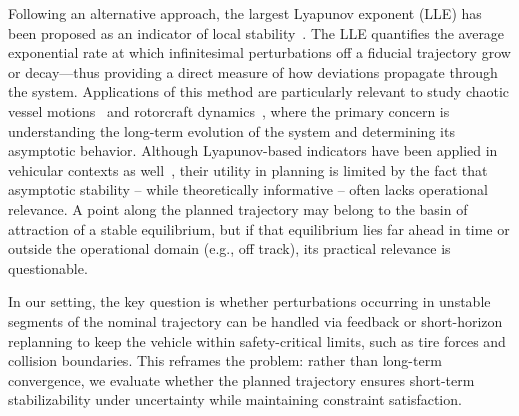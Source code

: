 Following an alternative approach, the largest Lyapunov exponent (LLE) has been proposed as an indicator of local stability~\cite{Meng:AnalysisGlobalCharacteristics:2022}. The LLE quantifies the average exponential rate at which infinitesimal perturbations off a fiducial trajectory grow or decay---thus providing a direct measure of how deviations propagate through the system.
Applications of this method are particularly relevant to study chaotic vessel motions~\cite{McCue:UseLyapunovExponents:2011} and rotorcraft dynamics~\cite{Tamer:StabilityNonlinearTimeDependent:2016,Cassoni:RotorcraftStabilityAnalysis:2024}, where the primary concern is understanding the long-term evolution of the system and determining its asymptotic behavior.
Although Lyapunov-based indicators have been applied in vehicular contexts as well~\cite{Sadri:StabilityAnalysisNonlinear:2013,Meng:AnalysisGlobalCharacteristics:2022}, their utility in planning is limited by the fact that asymptotic stability -- while theoretically informative -- often lacks operational relevance. A point along the planned trajectory may belong to the basin of attraction of a stable equilibrium, but if that equilibrium lies far ahead in time or outside the operational domain (e.g., off track), its practical relevance is questionable.

In our setting, the key question is whether perturbations occurring in unstable segments of the nominal trajectory can be handled via feedback or short-horizon replanning to keep the vehicle within safety-critical limits, such as tire forces and collision boundaries. This reframes the problem: rather than long-term convergence, we evaluate whether the planned trajectory ensures short-term stabilizability under uncertainty while maintaining constraint satisfaction.



